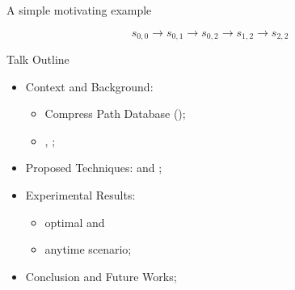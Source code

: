 \begin{frame}{A simple motivating example}
\begin{minipage}{0.45\textwidth}
        $$s_{0,0} \rightarrow s_{0,1} \rightarrow s_{0,2} \rightarrow s_{1,2} \rightarrow s_{2,2}$$
    \end{minipage}
\end{frame}

\begin{frame}{Talk Outline}
    \begin{itemize}
        \item Context and Background:
        \begin{itemize}
            \item Compress Path Database (\CPD{});
            \item \ALT{}, \AWA{};
        \end{itemize}
        \item Proposed Techniques: \CPDSearch{} and \anytimeCPDSearch{};
        \item Experimental Results: 
            \begin{itemize}
                \item optimal and 
                \item anytime scenario;
            \end{itemize}
        \item Conclusion and Future Works;
    \end{itemize}
\end{frame}